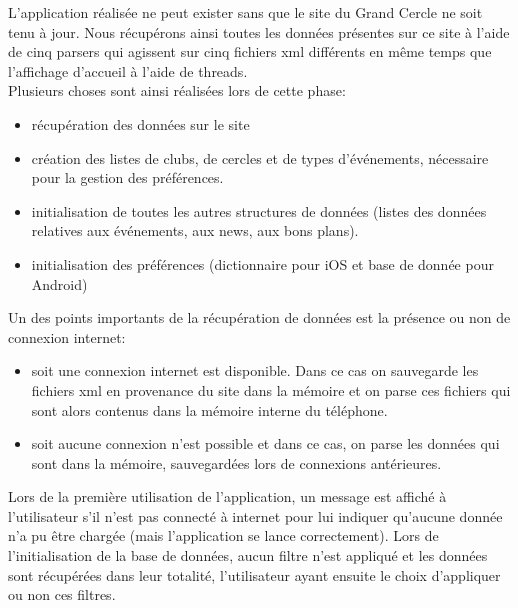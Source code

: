 \documentclass[a4paper, 11px]{article}
\begin{document}
L'application réalisée ne peut exister sans que le site du Grand Cercle ne soit tenu à jour. Nous récupérons ainsi toutes les données présentes sur ce site à l'aide de cinq parsers qui agissent sur cinq fichiers xml différents en même temps que l'affichage d'accueil à l'aide de threads.\\

\noindent Plusieurs choses sont ainsi réalisées lors de cette phase:
\begin{itemize}
\item récupération des données sur le site
\item création des listes de clubs, de cercles et de types d'événements, nécessaire pour la gestion des préférences.
\item initialisation de toutes les autres structures de données (listes des données relatives aux événements, aux news, aux bons plans).
\item initialisation des préférences (dictionnaire pour iOS et base de donnée pour Android)
\end{itemize}

\vspace{0.5cm}
\noindent Un des points importants de la récupération de données est la présence ou non de connexion internet: 
\begin{itemize}
\item soit une connexion internet est disponible. Dans ce cas on sauvegarde les fichiers xml en provenance du site dans la mémoire et on parse ces fichiers qui sont alors contenus dans la mémoire interne du téléphone.
\item soit aucune connexion n'est possible et dans ce cas, on parse les données qui sont dans la mémoire, sauvegardées lors de connexions antérieures.\\
\end{itemize}

\noindent Lors de la première utilisation de l'application, un message est affiché à l'utilisateur s'il n'est pas connecté à internet pour lui indiquer qu'aucune donnée n'a pu être chargée (mais l'application se lance correctement).
 Lors de l'initialisation de la base de données, aucun filtre n'est appliqué et les données sont récupérées dans leur totalité, l'utilisateur ayant ensuite le choix d'appliquer ou non ces filtres.
\end{document}
